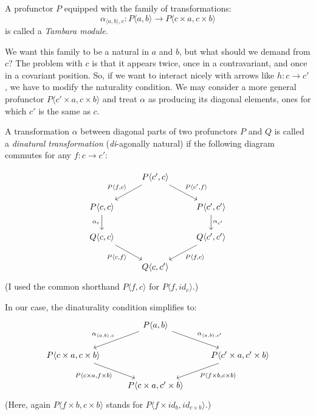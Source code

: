 \documentclass[DaoFP]{subfiles}
\begin{document}
A profunctor $P$ equipped with the family of transformations:
\[ \alpha_{\langle a, b\rangle, c} \colon P \langle a, b \rangle \to P \langle c \times a, c \times b \rangle \]
is called a \emph{Tambara module}. 

We want this family to be a natural in $a$ and $b$, but what should we demand from $c$? The problem with $c$ is that it appears twice, once in a contravariant, and once in a covariant position. So, if we want to interact nicely with arrows like $h \colon c \to c'$, we have to modify the naturality condition. We may consider a more general profunctor $P \langle c' \times a, c \times b \rangle$ and treat $\alpha$ as producing its diagonal elements, ones for which $c'$ is the same as $c$. 

A transformation $\alpha$ between diagonal parts of two profunctors $P$ and $Q$ is called a \emph{dinatural transformation} (\emph{di}-agonally natural) if the following diagram commutes for any $f \colon c \to c'$:

\[
 \begin{tikzcd}
 & P \langle c', c \rangle
 \arrow[dl, "{P \langle f, c \rangle}"']
 \arrow[dr, "{P \langle c', f \rangle}"]
 \\
 P \langle c, c \rangle 
  \arrow[d, "\alpha_c"']
 && P \langle c', c' \rangle
 \arrow[d, "\alpha_{c'}"]
 \\
 Q \langle c, c \rangle
   \arrow[dr, "{P \langle c, f \rangle}"']
 &&  Q \langle c', c' \rangle
 \arrow[dl,"{P \langle f, c \rangle}"]
\\
&Q \langle c, c' \rangle
 \end{tikzcd}
\]
(I used the common shorthand $P \langle f, c \rangle$ for $P \langle f, id_c \rangle$.)

In our case, the dinaturality condition simplifies to:
\[
 \begin{tikzcd}
 & P \langle a, b \rangle
 \arrow[dl, "{\alpha_{\langle a, b \rangle, c}}"']
 \arrow[dr, "{\alpha_{\langle a, b \rangle, c'}}"]
 \\
 P \langle c \times a, c \times b \rangle
   \arrow[dr, "{P \langle c \times a, f \times b \rangle}"']
 &&  P \langle c' \times a, c'  \times b\rangle
 \arrow[dl,"{P \langle f \times b, c \times b \rangle}"]
\\
&P \langle c \times a, c' \times b \rangle
 \end{tikzcd}
\]
(Here, again $P \langle f \times b, c \times b \rangle$ stands for $P \langle f \times id_b, id_{c \times b} \rangle$.)
\end{document}
